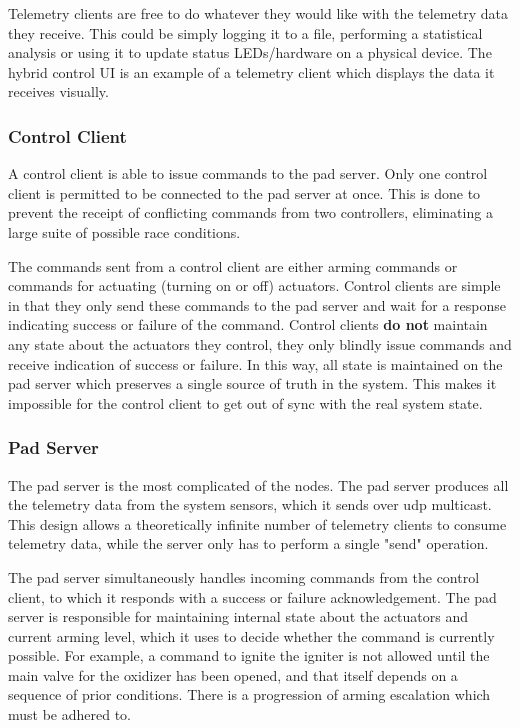 Telemetry clients are free to do whatever they would like with the telemetry data they receive. This could be simply logging it to a file, performing a statistical analysis or using it to update status LEDs/hardware on a physical device. The hybrid control UI is an example of a telemetry client which displays the data it receives visually.

\subsubsection{Control Client}

A control client is able to issue commands to the pad server. Only one control client is permitted to be connected to the pad server at once. This is done to prevent the receipt of conflicting commands from two controllers, eliminating a large suite of possible race conditions.

The commands sent from a control client are either arming commands or commands for actuating (turning on or off) actuators. Control clients are simple in that they only send these commands to the pad server and wait for a response indicating success or failure of the command. Control clients \textbf{do not} maintain any state about the actuators they control, they only blindly issue commands and receive indication of success or failure. In this way, all state is maintained on the pad server which preserves a single source of truth in the system. This makes it impossible for the control client to get out of sync with the real system state.

\subsubsection{Pad Server}

The pad server is the most complicated of the nodes. The pad server produces all the telemetry data from the system sensors, which it sends over \gls{udp} multicast. This design allows a theoretically infinite number of telemetry clients to consume telemetry data, while the server only has to perform a single "send" operation.

The pad server simultaneously handles incoming commands from the control client, to which it responds with a success or failure acknowledgement. The pad server is responsible for maintaining internal state about the actuators and current arming level, which it uses to decide whether the command is currently possible. For example, a command to ignite the igniter is not allowed until the main valve for the oxidizer has been opened, and that itself depends on a sequence of prior conditions. There is a progression of arming escalation which must be adhered to.

